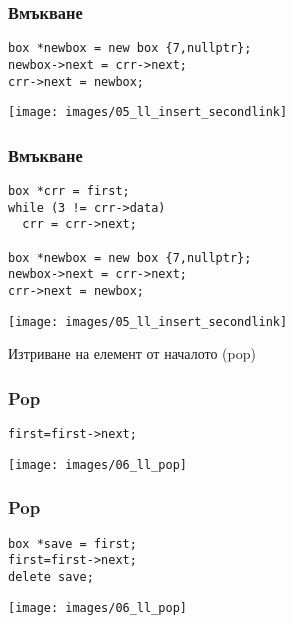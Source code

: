 \documentclass{beamer}
\begin{document}
\begin{frame}[fragile]
\frametitle{Вмъкване}

\begin{flushleft}
\begin{lstlisting}
box *newbox = new box {7,nullptr};
newbox->next = crr->next;
crr->next = newbox;
\end{lstlisting}  
\end{flushleft}


\texttt{[image: images/05\_ll\_insert\_secondlink]}

\end{frame}



\begin{frame}[fragile]
\frametitle{Вмъкване}

\begin{flushleft}
\begin{lstlisting}
box *crr = first;
while (3 != crr->data)
  crr = crr->next;

box *newbox = new box {7,nullptr};
newbox->next = crr->next;
crr->next = newbox;
\end{lstlisting}  
\end{flushleft}


\texttt{[image: images/05\_ll\_insert\_secondlink]}

\end{frame}



\begin{frame}
\centerline{Изтриване на елемент от началото (pop)}
\end{frame}



\begin{frame}[fragile]
\frametitle{Pop}

\begin{flushleft}
\begin{lstlisting}
first=first->next;
\end{lstlisting}  
\end{flushleft}


\texttt{[image: images/06\_ll\_pop]}

\end{frame}


\begin{frame}[fragile]
\frametitle{Pop}

\begin{flushleft}
\begin{lstlisting}
box *save = first;
first=first->next;
delete save;
\end{lstlisting}  
\end{flushleft}


\texttt{[image: images/06\_ll\_pop]}

\end{frame}
\end{document}
